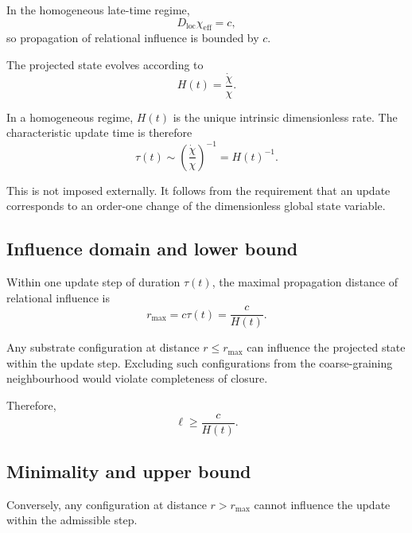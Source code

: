     In the homogeneous late-time regime,
    \begin{equation}
      D_{\mathrm{loc}}\chi_{\mathrm{eff}} = c,
    \end{equation}
    so propagation of relational influence is bounded by $c$.

    The projected state evolves according to
    \begin{equation}
      H(t) = \frac{\dot{\chi}}{\chi}.
    \end{equation}

    In a homogeneous regime, $H(t)$ is the unique intrinsic dimensionless rate.
    The characteristic update time is therefore
    \begin{equation}
      \tau(t) \sim \left(\frac{\dot{\chi}}{\chi}\right)^{-1} = H(t)^{-1}.
    \end{equation}

    This is not imposed externally.
    It follows from the requirement that an update corresponds to an
    order-one change of the dimensionless global state variable.

  \subsection{Influence domain and lower bound}
    \label{subsec:influence-domain-and-lower-bound}

    Within one update step of duration $\tau(t)$, the maximal
    propagation distance of relational influence is
    \begin{equation}
      r_{\mathrm{max}} = c \tau(t) = \frac{c}{H(t)}.
    \end{equation}

    Any substrate configuration at distance $r \le r_{\mathrm{max}}$
    can influence the projected state within the update step.
    Excluding such configurations from the coarse-graining neighbourhood
    would violate completeness of closure.

    Therefore,
    \begin{equation}
      \ell \ge \frac{c}{H(t)}.
    \end{equation}

  \subsection{Minimality and upper bound}
    \label{subsec:minimality-and-upper-bound}

    Conversely, any configuration at distance $r > r_{\mathrm{max}}$
    cannot influence the update within the admissible step.

